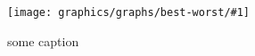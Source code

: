 \newcommand{\graphtheshit}[3]{
    \begin{figure}[h!]
    \begin{minipage}[t]{0.5\textwidth}
        \texttt{[image: graphics/graphs/best-worst/\#1]}
        \caption{#2}
        \label{#3}
    \end{minipage}
    \end{figure}
}

\newcommand{\somethingsomething}{
  \graphtheshit{best-False_cover_rate_(FCR)-Events_hit_rate_(EHR)-CovNu-GSR.pdf}
  {some caption}{some label}
}

\somethingsomething